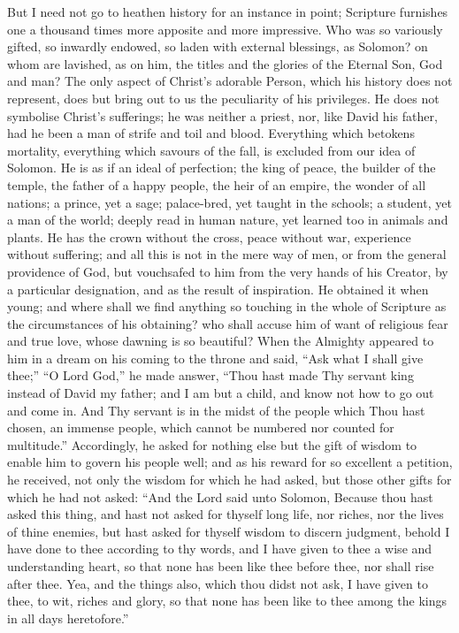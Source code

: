 But I need not go to heathen history for an instance in point;
Scripture furnishes one a thousand times more apposite and more
impressive. Who was so variously gifted, so inwardly endowed, so laden
with external blessings, as Solomon? on whom are lavished, as on him,
the titles and the glories of the Eternal Son, God and man? The only
aspect of Christ's adorable Person, which his history does not
represent, does but bring out to us the peculiarity of his privileges.
He does not symbolise Christ's sufferings; he was neither a priest,
nor, like David his father, had he been a man of strife and toil and
blood. Everything which betokens mortality, everything which savours
of the fall, is excluded from our idea of Solomon. He is as if an
ideal of perfection; the king of peace, the builder of the temple, the
father of a happy people, the heir of an empire, the wonder of all
nations; a prince, yet a sage; palace-bred, yet taught in the schools;
a student, yet a man of the world; deeply read in human nature, yet
learned too in animals and plants. He has the crown without the cross,
peace without war, experience without suffering; and all this is not
in the mere way of men, or from the general providence of God, but
vouchsafed to him from the very hands of his Creator, by a particular
designation, and as the result of inspiration. He obtained it when
young; and where shall we find anything so touching in the whole of
Scripture as the circumstances of his obtaining? who shall accuse him
of want of religious fear and true love, whose dawning is so
beautiful? When the Almighty appeared to him in a dream on his coming
to the throne and said, ``Ask what I shall give thee;''
``O Lord God,'' he made answer, ``Thou hast made Thy
servant king instead of David my father; and I am but a child, and
know not how to go out and come in. And Thy servant is in the midst of
the people which Thou hast chosen, an immense people, which cannot be
numbered nor counted for multitude.'' Accordingly, he asked for
nothing else but the gift of wisdom to enable him to govern his people
well; and as his reward for so excellent a petition, he received, not
only the wisdom for which he had asked, but those other gifts for
which he had not asked: ``And the Lord said unto Solomon, Because
thou hast asked this thing, and hast not asked for thyself long life,
nor riches, nor the lives of thine enemies, but hast asked for thyself
wisdom to discern judgment, behold I have done to thee according to
thy words, and I have given to thee a wise and understanding heart, so
that none has been like thee before thee, nor shall rise after thee.
Yea, and the things also, which thou didst not ask, I have given to
thee, to wit, riches and glory, so that none has been like to thee
among the kings in all days heretofore.''

